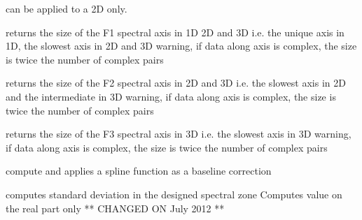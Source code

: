 \documentclass[letterpaper,10pt,openany,oneside]{sphinxmanual}
\begin{document}
\begin{fulllineitems}
\begin{fulllineitems}
\begin{description}
\end{description}

can be applied to a 2D only.

\end{fulllineitems}


\begin{fulllineitems}
\label{rst/code:NPKData.NPKData.size1}
returns the size of the F1 spectral axis in 1D 2D and 3D
i.e. the unique axis in 1D, the slowest axis in 2D and 3D
warning, if data along axis is complex, the size is twice the number of complex pairs

\end{fulllineitems}


\begin{fulllineitems}
\label{rst/code:NPKData.NPKData.size2}
returns the size of the F2 spectral axis in 2D and 3D
i.e. the slowest axis in 2D and the intermediate in 3D
warning, if data along axis is complex, the size is twice the number of complex pairs

\end{fulllineitems}


\begin{fulllineitems}
\label{rst/code:NPKData.NPKData.size3}
returns the size of the F3 spectral axis in 3D
i.e. the slowest axis in 3D
warning, if data along axis is complex, the size is twice the number of complex pairs

\end{fulllineitems}


\begin{fulllineitems}
\label{rst/code:NPKData.NPKData.spline_interpolate}
compute and applies a spline function as a baseline correction

\end{fulllineitems}


\begin{fulllineitems}
\label{rst/code:NPKData.NPKData.std}
computes standard deviation in the designed spectral zone
Computes value on the real part only ** CHANGED ON July 2012 **


\end{fulllineitems}
\end{fulllineitems}
\end{document}

